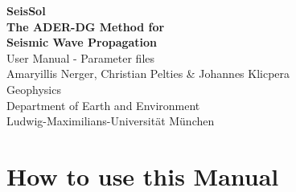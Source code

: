 \documentclass[12pt,twoside]{article}
\begin{document}
\begin{titlepage}

\thispagestyle{empty}
\begin{center}
{\bf{\Huge SeisSol }}\\
\vspace{0,5cm}
{\bf{\Large The ADER-DG Method for \\
\vspace{0,2cm}
           Seismic Wave Propagation}} \\
\vspace{4,0cm}
{\LARGE{\sc User Manual - Parameter files}}\\
\vspace{4,0cm}
{\Large Amaryillis Nerger, Christian Pelties \& Johannes Klicpera\\}
\vspace{2,5cm}
{\Large{\sc Geophysics\\
Department of Earth and Environment\\
Ludwig-Maximilians-Universit\"at M\"unchen\\}}
\end{center}

\end{titlepage}
\addtolength{\topmargin}{-0.5cm}
\pagestyle{headings}

\newpage
\thispagestyle{empty}
\rule{0cm}{1cm}


\tableofcontents

\newpage

\section{How to use this Manual}
\end{document}
